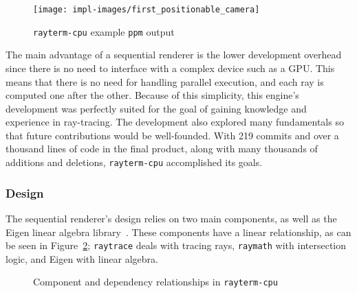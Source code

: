 \vspace{0.3em}
\begin{figure}[htb]
  \centering
  \texttt{[image: impl-images/first\_positionable\_camera]}
  \caption{\texttt{rayterm-cpu} example \texttt{ppm} output}
\label{fig:rayterm-cpu_ppm}
\end{figure}

The main advantage of a sequential renderer is the lower development overhead since there is no need to interface with a complex device such as a GPU.
This means that there is no need for handling parallel execution, and each ray is computed one after the other.
Because of this simplicity, this engine's development was perfectly suited for the goal of gaining knowledge and experience in ray-tracing.
The development also explored many fundamentals so that future contributions would be well-founded.
With 219 commits and over a thousand lines of code in the final product, along with many thousands of additions and deletions, \texttt{rayterm-cpu} accomplished its goals.

\subsubsection{Design} \label{ch:methods:renderer:sequential:design}

The sequential renderer's design relies on two main components, as well as the Eigen linear algebra library~\cite{eigenweb}.
These components have a linear relationship, as can be seen in Figure~\ref{fig:rayterm-cpu_components}; \texttt{raytrace} deals with tracing rays, \texttt{raymath} with intersection logic, and Eigen with linear algebra.

\vspace{0.3em}
\begin{figure}[htb]
  \centering
  \caption{Component and dependency relationships in \texttt{rayterm-cpu}}
\label{fig:rayterm-cpu_components}
\end{figure}

